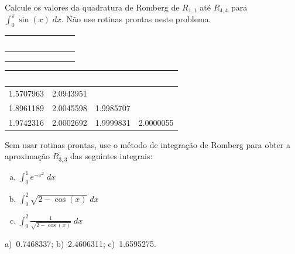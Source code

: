 \begin{exer}
 Calcule os valores da quadratura de Romberg de $R_{1,1}$ até $R_{4,4}$ para $\int_0^\pi \sin(x)\;dx$. Não use rotinas prontas neste problema.
\begin{center}
\begin{tabular}{|c|c|c|c|}
\hline
~\hspace{40pt}~ & ~\hspace{40pt}~& ~\hspace{40pt}~& ~\hspace{40pt}~\\
\hline
 & & &\\
\hline
&&&\\
\hline
&&&\\
\hline
\end{tabular}
\end{center}
\end{exer}
\begin{resp}

\begin{center}
\begin{tabular}{|c|c|c|c|}
\hline
~\hspace{40pt}~& ~\hspace{40pt}~& ~\hspace{40pt}~&\\
\hline
1.5707963  &  2.0943951 &&\\
\hline
1.8961189  &  2.0045598 &   1.9985707  &   \\
\hline
1.9742316  &  2.0002692 &   1.9999831 &   2.0000055  \\
\hline
\end{tabular}
\end{center}

\end{resp}

\begin{exer}
Sem usar rotinas prontas, use o método de integração de Romberg para obter a aproximação $R_{3,3}$ das seguintes integrais:
\begin{enumerate}[a)]
\item $\int_{0}^1 e^{-x^2}\;dx$
\item $\int_{0}^2 \sqrt{2-\cos(x)}\;dx$
\item $\int_{0}^2 \frac{1}{\sqrt{2-\cos(x)}}\;dx$
\end{enumerate}
\end{exer}
\begin{resp}
  a)~0.7468337; b)~2.4606311; c)~1.6595275.
\end{resp}

